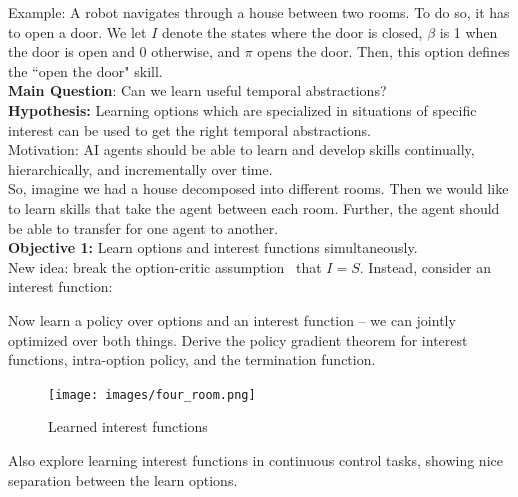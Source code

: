 
Example: A robot navigates through a house between two rooms. To do so, it has to open a door. We let $I$ denote the states where the door is closed, $\beta$ is 1 when the door is open and 0 otherwise, and $\pi$ opens the door. Then, this option defines the ``open the door" skill. \\

{\bf Main Question}: Can we learn useful temporal abstractions? \\

{\bf Hypothesis:} Learning options which are specialized in situations of specific interest can be used to get the right temporal abstractions. \\

Motivation: AI agents should be able to learn and develop skills continually, hierarchically, and incrementally over time. \\

So, imagine we had a house decomposed into different rooms. Then we would like to learn skills that take the agent between each room. Further, the agent should be able to transfer for one agent to another. \\

{\bf Objective 1:} Learn options and interest functions simultaneously. \\

New idea: break the option-critic assumption~\cite{bacon2017option} that $I = S$. Instead, consider an interest function:

Now learn a policy over options and an interest function -- we can jointly optimized over both things. Derive the policy gradient theorem for interest functions, intra-option policy, and the termination function. \\

\begin{figure}[h!]
    \centering
    \texttt{[image: images/four\_room.png]}
    \caption{Learned interest functions}
    \label{fig:opt_four}
\end{figure}

Also explore learning interest functions in continuous control tasks, showing nice separation between the learn options. \\

